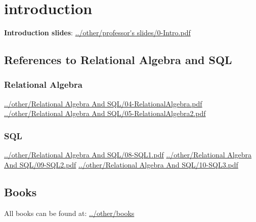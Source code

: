 \section{introduction}
\textbf{Introduction slides}:\newline
\url{../other/professor's slides/0-Intro.pdf}
\subsection{References to Relational Algebra and SQL}
\subsubsection*{Relational Algebra}
\url{../other/Relational Algebra And SQL/04-RelationalAlgebra.pdf}\newline
\newline
\url{../other/Relational Algebra And SQL/05-RelationalAlgebra2.pdf}
\subsubsection*{SQL}
\url{../other/Relational Algebra And SQL/08-SQL1.pdf}\newline
\newline
\url{../other/Relational Algebra And SQL/09-SQL2.pdf}\newline
\newline
\url{../other/Relational Algebra And SQL/10-SQL3.pdf}
\subsection{Books}
All books can be found at:\newline
\url{../other/books}\newline
\newline